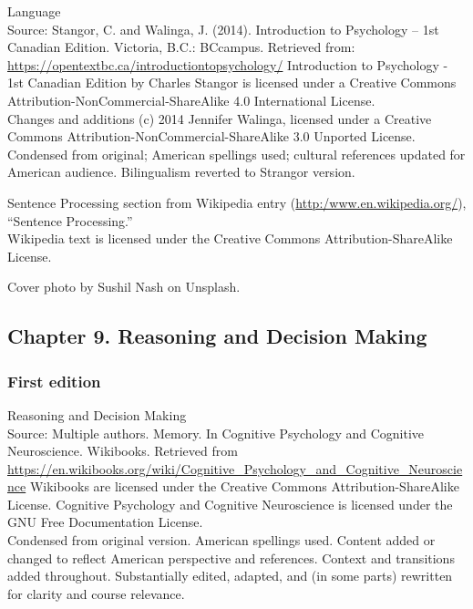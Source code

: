 \documentclass[
]{krantz}
\begin{document}
Language\\
Source: Stangor, C. and Walinga, J. (2014). Introduction to Psychology -- 1st Canadian Edition. Victoria, B.C.: BCcampus. Retrieved from: \url{https://opentextbc.ca/introductiontopsychology/}
Introduction to Psychology - 1st Canadian Edition by Charles Stangor is licensed under a Creative Commons Attribution-NonCommercial-ShareAlike 4.0 International License.\\
Changes and additions (c) 2014 Jennifer Walinga, licensed under a Creative Commons Attribution-NonCommercial-ShareAlike 3.0 Unported License.\\
Condensed from original; American spellings used; cultural references updated for American audience. Bilingualism reverted to Strangor version.

Sentence Processing section from Wikipedia entry (\url{http:/www.en.wikipedia.org/}), ``Sentence Processing.''\\
Wikipedia text is licensed under the Creative Commons Attribution-ShareAlike License.

Cover photo by Sushil Nash on Unsplash.

\hypertarget{chapter-9.-reasoning-and-decision-making}{%
\subsection*{Chapter 9. Reasoning and Decision Making}\label{chapter-9.-reasoning-and-decision-making}}


\hypertarget{first-edition-9}{%
\subsubsection*{First edition}\label{first-edition-9}}


Reasoning and Decision Making\\
Source: Multiple authors. Memory. In Cognitive Psychology and Cognitive Neuroscience. Wikibooks. Retrieved from \url{https://en.wikibooks.org/wiki/Cognitive_Psychology_and_Cognitive_Neuroscience}
Wikibooks are licensed under the Creative Commons Attribution-ShareAlike License.
Cognitive Psychology and Cognitive Neuroscience is licensed under the GNU Free Documentation License.\\
Condensed from original version. American spellings used. Content added or changed to reflect American perspective and references. Context and transitions added throughout. Substantially edited, adapted, and (in some parts) rewritten for clarity and course relevance.
\end{document}
